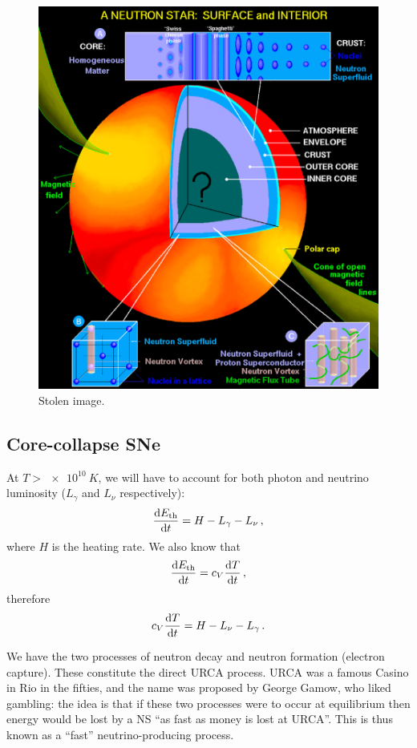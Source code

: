 \documentclass[main.tex]{subfiles}
\begin{document}
\begin{figure}[ht]
\centering
\includegraphics[width=\textwidth]{figures/NS-interior}
\caption{Stolen image.}
\label{fig:NS-interior}
\end{figure}

\subsection{Core-collapse SNe}

At \(T > \SI{e10}{K}\), we will have to account for both photon and neutrino luminosity (\(L_\gamma \) and \(L_\nu \) respectively): 
%
\begin{align}
\dv{E _{\text{th}}}{t} = H - L_\gamma - L_\nu 
\,,
\end{align}
%
where \(H\) is the heating rate. We also know that 
%
\begin{align}
\dv{E _{\text{th}}}{t} = c_V \dv{T }{t}
\,,
\end{align}
%
therefore 
%
\begin{align}
c_V \dv{T }{t} = H - L_\nu - L_\gamma 
\,.
\end{align}

We have the two processes of neutron decay and neutron formation (electron capture). These constitute the direct URCA process. 
URCA was a famous Casino in Rio in the fifties, and the name was proposed by George Gamow, who liked gambling: 
the idea is that if these two processes were to occur at equilibrium then energy would be lost by a NS ``as fast as money is lost at URCA''. This is thus known as a ``fast'' neutrino-producing process.
\end{document}
